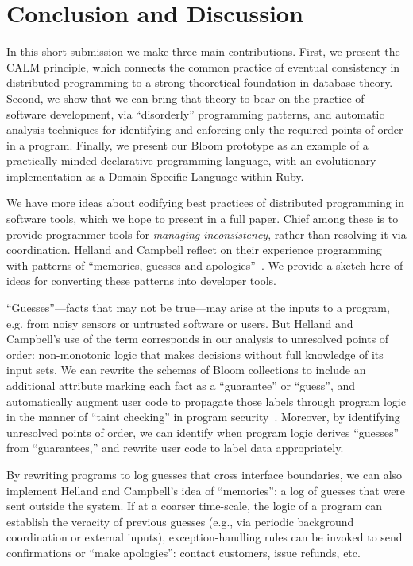 \section{Conclusion and Discussion}
\label{sec:conclusion}
In this short submission we make three main contributions.  First, we present the CALM principle, which connects the common practice of eventual consistency in distributed programming to a strong theoretical foundation in database theory.  Second, we show that we can bring that theory to bear on the practice of software development, via ``disorderly'' programming patterns, and automatic analysis techniques for  identifying and enforcing only the required points of order in a program. Finally, we present our Bloom prototype as an example of a practically-minded declarative programming language, with an evolutionary implementation as a Domain-Specific Language within Ruby.

We have more ideas about codifying best practices of distributed programming in software tools, which we hope to present in a full paper.  Chief among these is to provide programmer tools for \emph{managing inconsistency}, rather than resolving it via coordination.  Helland and Campbell reflect on their experience programming with patterns of ``memories, guesses and apologies''~\cite{quicksand}.  We provide a sketch here of ideas for converting these patterns into developer tools.

``Guesses''---facts that may not be true---may arise at the inputs to a program, e.g. from noisy sensors or untrusted software or users.  But Helland and Campbell's use of the term corresponds in our analysis to unresolved points of order: non-monotonic logic that makes decisions without full knowledge of its input sets.  We can rewrite the schemas of Bloom collections to include an additional attribute marking each fact as a ``guarantee'' or ``guess'', and automatically augment user code to propagate those labels through program logic in the manner of ``taint checking'' in program security~\cite{taint,asbestos}.  Moreover, by identifying unresolved points of order, we can identify when program logic derives ``guesses'' from ``guarantees,'' and rewrite user code to label data appropriately.

By rewriting programs to log guesses that cross interface boundaries, we can also implement Helland and Campbell's idea of ``memories'': a log of guesses that were sent outside the system.  If at a coarser time-scale, the logic of a program can establish the veracity of previous guesses (e.g., via periodic background coordination or external inputs), exception-handling rules can be invoked to send confirmations or ``make apologies'': contact customers, issue refunds, etc.

